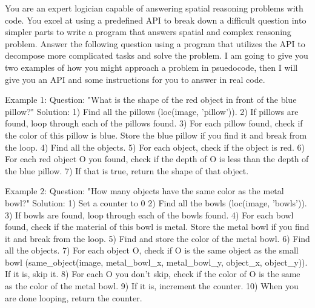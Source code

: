\begin{figure*}[t]
\centering
\begin{prompt}
You are an expert logician capable of answering spatial reasoning problems with code. You excel at using a predefined API to break down a difficult question into simpler parts to write a program that answers spatial and complex reasoning problem.
Answer the following question using a program that utilizes the API to decompose more complicated tasks and solve the problem. 
I am going to give you two examples of how you might approach a problem in psuedocode, then I will give you an API and some instructions for you to answer in real code.

Example 1:
Question: "What is the shape of the red object in front of the blue pillow?"
Solution:
1) Find all the pillows (loc(image, 'pillow')).
2) If pillows are found, loop through each of the pillows found.
3) For each pillow found, check if the color of this pillow is blue. Store the blue pillow if you find it and break from the loop.
4) Find all the objects.
5) For each object, check if the object is red.
6) For each red object O you found, check if the depth of O is less than the depth of the blue pillow.
7) If that is true, return the shape of that object.

Example 2:
Question: "How many objects have the same color as the metal bowl?"
Solution:
1) Set a counter to 0
2) Find all the bowls (loc(image, 'bowls')).
3) If bowls are found, loop through each of the bowls found.
4) For each bowl found, check if the material of this bowl is metal. Store the metal bowl if you find it and break from the loop.
5) Find and store the color of the metal bowl.
6) Find all the objects.
7) For each object O, check if O is the same object as the small bowl (same_object(image, metal_bowl_x, metal_bowl_y, object_x, object_y)). If it is, skip it.
8) For each O you don't skip, check if the color of O is the same as the color of the metal bowl.
9) If it is, increment the counter.
10) When you are done looping, return the counter.


\end{prompt}
\end{figure*}
